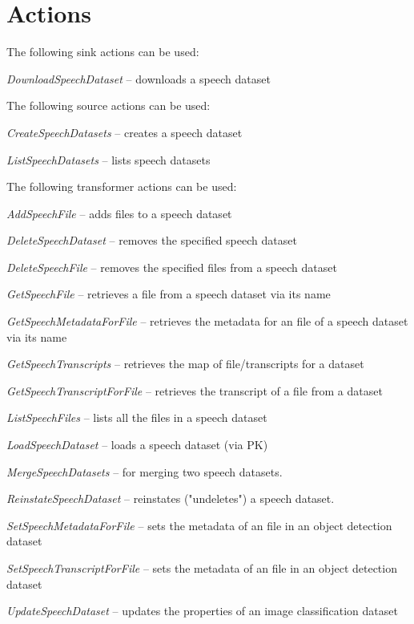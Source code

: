 \documentclass[a4paper]{book}
\begin{document}
\section{Actions}
The following sink actions can be used:
\begin{tight_itemize}
  \item \textit{DownloadSpeechDataset} -- downloads a speech dataset
\end{tight_itemize}
The following source actions can be used:
\begin{tight_itemize}
  \item \textit{CreateSpeechDatasets} -- creates a speech dataset
  \item \textit{ListSpeechDatasets} -- lists speech datasets
\end{tight_itemize}
The following transformer actions can be used:
\begin{tight_itemize}
  \item \textit{AddSpeechFile} -- adds files to a speech dataset
  \item \textit{DeleteSpeechDataset} -- removes the specified speech dataset
  \item \textit{DeleteSpeechFile} -- removes the specified files from a speech dataset
  \item \textit{GetSpeechFile} -- retrieves a file from a speech dataset via its name
  \item \textit{GetSpeechMetadataForFile} -- retrieves the metadata for an file of a speech dataset via its name
  \item \textit{GetSpeechTranscripts} -- retrieves the map of file/transcripts for a dataset
  \item \textit{GetSpeechTranscriptForFile} -- retrieves the transcript of a file from a dataset
  \item \textit{ListSpeechFiles} -- lists all the files in a speech dataset
  \item \textit{LoadSpeechDataset} -- loads a speech dataset (via PK)
  \item \textit{MergeSpeechDatasets} -- for merging two speech datasets.
  \item \textit{ReinstateSpeechDataset} -- reinstates ("undeletes") a speech dataset.
  \item \textit{SetSpeechMetadataForFile} -- sets the metadata of an file in an object detection dataset
  \item \textit{SetSpeechTranscriptForFile} -- sets the metadata of an file in an object detection dataset
  \item \textit{UpdateSpeechDataset} -- updates the properties of an image classification dataset
\end{tight_itemize}
\end{document}
